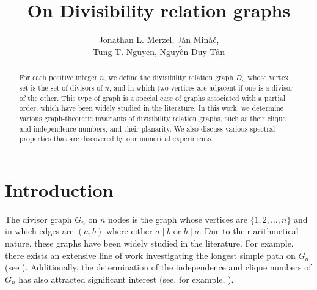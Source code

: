 \documentclass[11pt,a4paper]{amsart}
\theoremstyle{definition}
\numberwithin{equation}{section}
\begin{document}
\title{On Divisibility relation graphs}
\author[J. Merzel, J. Min\'a\v{c}, T.T. Nguyen, N.D. Tan]{Jonathan L. Merzel, J\'an Min\'a\v{c}, \\ Tung T. Nguyen, Nguy$\tilde{\text{\^{e}}}$n Duy T\^{a}n}



\address{Soka University of America}

\address{
University of Western Ontario}

\address{Lake Forest College}


\address{Hanoi University of Science and Technology}


\date{}

\maketitle
\begin{abstract}
For each positive integer $n$, we define the divisibility relation graph  $D_n$ whose vertex set is the set of divisors of $n$, and  in which two vertices are adjacent if one is a divisor of the other. This type of graph is a special case of graphs associated with a partial order, which have been widely studied in the literature. In this work, we determine various graph-theoretic invariants of divisibility relation graphs, such as their clique and independence numbers, and their planarity. We also discuss various spectral properties that are discovered by our numerical experiments. 

\end{abstract}

\section{Introduction}
The divisor graph $G_n$ on $n$ nodes is the graph whose vertices are $\{1, 2, \ldots, n \}$ and in which edges are $(a,b)$ where either $a \mid b$ or $b \mid a.$ Due to  their arithmetical nature, these graphs have been widely studied in the literature. For example, there exists an extensive line of work investigating the longest simple path on $G_n$ (see \cite{erdHos1995graphe, Melotti, pollington1983there, pomerance1983longest}). Additionally, the determination of the independence and clique numbers of $G_n$ has also attracted significant interest (see, for example, \cite{Rodrigo, Cameron1, McNew}).
\end{document}
